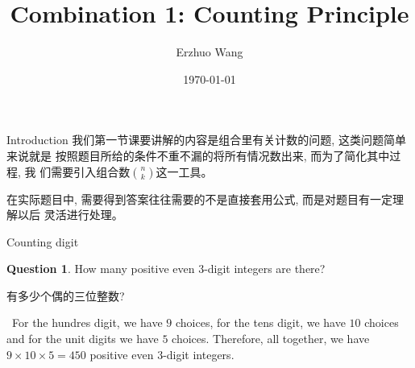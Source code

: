 \documentclass{beamer}
\title{Combination 1: Counting Principle}
\institute{Youth STEM Academy}
\author{Erzhuo Wang}
\date{\today}
\theoremstyle{definition}
\newtheorem{theo}[defn]{Theorem}
\newtheorem{exam}[defn]{Example}
\newtheorem{ques}[defn]{Question}
\newenvironment{prooff}{{\noindent\it\textcolor{cyan!40!black}{Proof}:}\,}{\par}
\begin{document}
\begin{frame}
    \titlepage
\end{frame}
\begin{frame}{Introduction}
     我们第一节课要讲解的内容是组合里有关计数的问题, 这类问题简单来说就是
     按照题目所给的条件不重不漏的将所有情况数出来, 而为了简化其中过程, 我
     们需要引入组合数$\binom{n}{k}$这一工具。 

     在实际题目中, 需要得到答案往往需要的不是直接套用公式, 而是对题目有一定理解以后
     灵活进行处理。
\end{frame}
\begin{frame}{Counting digit}
    \begin{ques}
        How many positive even 3-digit integers are there?

        有多少个偶的三位整数?

    \end{ques}
    \pause
    \begin{prooff}
        For the hundres digit, we have $9$ choices, for the tens digit, we have $10$ choices and for the unit digits we have $5$ choices. Therefore, all together, we have $9\times 10\times 5=450$ positive even
        $3$-digit integers.
    \end{prooff}
\end{frame}
\end{document}
